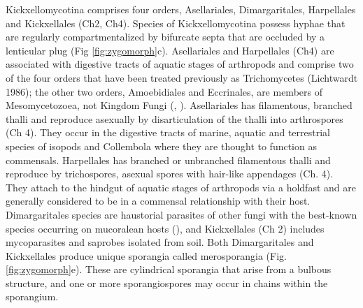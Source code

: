 \documentclass[]{book}
\begin{document}
Kickxellomycotina comprises four orders, Asellariales, Dimargaritales,
Harpellales and Kickxellales (Ch2, Ch4). Species of Kickxellomycotina
possess hyphae that are regularly compartmentalized by bifurcate septa
that are occluded by a lenticular plug (Fig \ref{fig:zygomorph}c).
Asellariales and Harpellales (Ch4) are associated with digestive tracts
of aquatic stages of arthropods and comprise two of the four orders that
have been treated previously as Trichomycetes (Lichtwardt 1986); the
other two orders, Amoebidiales and Eccrinales, are members of
Mesomycetozoea, not Kingdom Fungi (\citet{Benny_2000},
\citet{Cafaro_2005}). Asellariales has filamentous, branched thalli and
reproduce asexually by disarticulation of the thalli into arthrospores
(Ch 4). They occur in the digestive tracts of marine, aquatic and
terrestrial species of isopods and Collembola where they are thought to
function as commensals. Harpellales has branched or unbranched
filamentous thalli and reproduce by trichospores, asexual spores with
hair-like appendages (Ch. 4). They attach to the hindgut of aquatic
stages of arthropods via a holdfast and are generally considered to be
in a commensal relationship with their host. Dimargaritales species are
haustorial parasites of other fungi with the best-known species
occurring on mucoralean hosts (\citet{Benjamin_1965}), and Kickxellales
(Ch 2) includes mycoparasites and saprobes isolated from soil. Both
Dimargaritales and Kickxellales produce unique sporangia called
merosporangia (Fig. \ref{fig:zygomorph}e). These are cylindrical
sporangia that arise from a bulbous structure, and one or more
sporangiospores may occur in chains within the sporangium.
\end{document}
